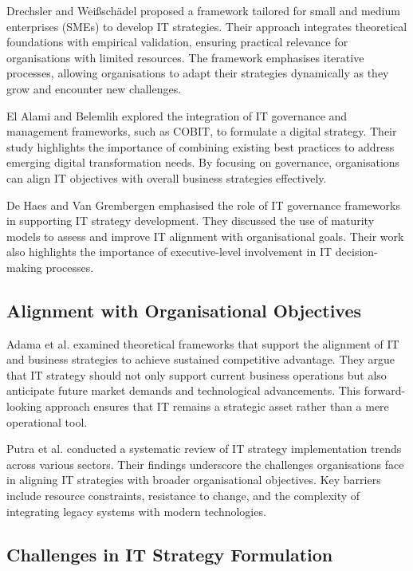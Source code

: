 \documentclass[conference]{IEEEtran}
\begin{document}
Drechsler and Weißschädel \cite{drechsler2018framework} proposed a framework tailored for small and medium enterprises (SMEs) to develop IT strategies. Their approach integrates theoretical foundations with empirical validation, ensuring practical relevance for organisations with limited resources. The framework emphasises iterative processes, allowing organisations to adapt their strategies dynamically as they grow and encounter new challenges.

El Alami and Belemlih \cite{elalami2021digital} explored the integration of IT governance and management frameworks, such as COBIT, to formulate a digital strategy. Their study highlights the importance of combining existing best practices to address emerging digital transformation needs. By focusing on governance, organisations can align IT objectives with overall business strategies effectively.

De Haes and Van Grembergen \cite{dehaes2009governance} emphasised the role of IT governance frameworks in supporting IT strategy development. They discussed the use of maturity models to assess and improve IT alignment with organisational goals. Their work also highlights the importance of executive-level involvement in IT decision-making processes.

\subsection{Alignment with Organisational Objectives}

Adama et al. \cite{adama2024alignment} examined theoretical frameworks that support the alignment of IT and business strategies to achieve sustained competitive advantage. They argue that IT strategy should not only support current business operations but also anticipate future market demands and technological advancements. This forward-looking approach ensures that IT remains a strategic asset rather than a mere operational tool.

Putra et al. \cite{putra2022trends} conducted a systematic review of IT strategy implementation trends across various sectors. Their findings underscore the challenges organisations face in aligning IT strategies with broader organisational objectives. Key barriers include resource constraints, resistance to change, and the complexity of integrating legacy systems with modern technologies.


\subsection{Challenges in IT Strategy Formulation}
\end{document}
